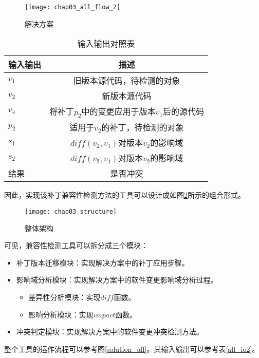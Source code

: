 \begin{figure}[H]
	\centering
	\texttt{[image: chap03\_all\_flow\_2]}
	\caption {解决方案}
	\label {all_flow}	
\end{figure}

\begin{table}[H]
	\caption{输入输出对照表}
	\label{all_io}
	\centering
	\begin{tabular}{lc}
		\toprule[1.5pt]
		{\heiti 输入输出} & {\heiti 描述}\\\midrule[1pt]
		$v_1$ & 旧版本源代码，待检测的对象 \\
		$v_2$ & 新版本源代码 \\
		$v_4$ & 将补丁$p_2$中的变更应用于版本$v_1$后的源代码 \\
		$p_2$ & 适用于$v_2$的补丁，待检测的对象 \\
		$s_1$ & $diff(v_2,v_1)$对版本$v_2$的影响域 \\
		$s_2$ & $diff(v_2,v_4)$对版本$v_2$的影响域 \\
		结果 & 是否冲突 \\
		\bottomrule[1.5pt]
	\end{tabular}
\end{table}

因此，实现该补丁兼容性检测方法的工具可以设计成如图\ref {structure}所示的组合形式。

\begin{figure}[H]
	\centering
	\texttt{[image: chap03\_structure]}
	\caption {整体架构}	
	\label {structure}
\end{figure}

可见，兼容性检测工具可以拆分成三个模块：
\begin{itemize}
	\item 补丁版本迁移模块：实现解决方案中的补丁应用步骤。
	\item 影响域分析模块：实现解决方案中的软件变更影响域分析过程。
	\begin{itemize}
		\item 差异性分析模块：实现$diff$函数。
		\item 影响分析模块：实现$impact$函数。
	\end{itemize}
	\item 冲突判定模块：实现解决方案中的软件变更冲突检测方法。
\end{itemize}

整个工具的运作流程可以参考图\ref {solution_all}。其输入输出可以参考表\ref {all_io2}。

